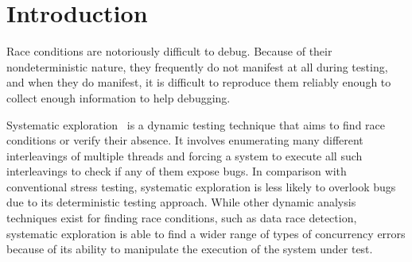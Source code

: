 \documentclass{llncs}
\begin{document}




\section{Introduction}

Race conditions are notoriously difficult to debug.
Because of their nondeterministic nature, they frequently do not manifest at all during testing, and when they do manifest, it is difficult to reproduce them reliably enough to collect enough information to help debugging.

Systematic exploration~\cite{verisoft} is a dynamic testing technique that aims to find race conditions or verify their absence. It involves enumerating many different interleavings of multiple threads and forcing a system to execute all such interleavings to check if any of them expose bugs.
In comparison with conventional stress testing, systematic exploration is less likely to overlook bugs due to its deterministic testing approach. While other dynamic analysis techniques exist for finding race conditions, such as data race detection, %
systematic exploration is able to find a wider range of types of concurrency errors because of its ability to manipulate the execution of the system under test.

\end{document}
